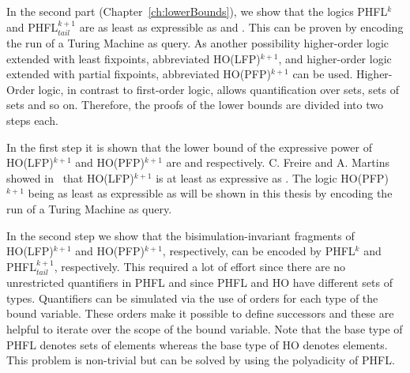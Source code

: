 In the second part (Chapter~\ref{ch:lowerBounds}), we show that the logics PHFL$^k$ and PHFL$^{k+1}_{tail}$ are as least as expressible as  and . This can be proven by encoding the run of a Turing Machine as query. As another possibility higher-order logic extended with least fixpoints, abbreviated HO(LFP)$^{k+1}$, and higher-order logic extended with partial fixpoints, abbreviated HO(PFP)$^{k+1}$ can be used. Higher-Order logic, in contrast to first-order logic, allows quantification over sets, sets of sets and so on. Therefore, the proofs of the lower bounds are divided into two steps each. 

In the first step it is shown that the lower bound of the expressive power of HO(LFP)$^{k+1}$ and HO(PFP)$^{k+1}$ are  and  respectively. C. Freire and A. Martins showed in~\cite{freireMartins2011descriptive} that HO(LFP)$^{k+1}$ is at least as expressive as . The logic HO(PFP)$^{k+1}$ being as least as expressible as  will be shown in this thesis by encoding the run of a Turing Machine as query.

In the second step we show that the bisimulation-invariant fragments of HO(LFP)$^{k+1}$ and HO(PFP)$^{k+1}$, respectively, can be encoded by PHFL$^k$ and PHFL$^{k+1}_{tail}$, respectively. This required a lot of effort since there are no unrestricted quantifiers in PHFL and since PHFL and HO have different sets of types. Quantifiers can be simulated via the use of orders for each type of the bound variable. These orders make it possible to define successors and these are helpful to iterate over the scope of the bound variable. Note that the base type of PHFL denotes sets of elements whereas the base type of HO denotes elements. This problem is non-trivial but can be solved by using the polyadicity of PHFL. 

